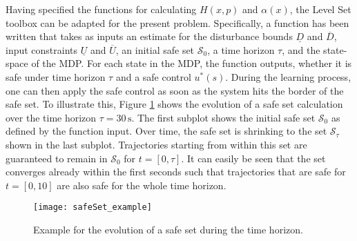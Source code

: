 \documentclass[../main.tex]{subfiles}
\begin{document}
Having specified the functions for calculating $H(x,p)$ and $\alpha(x)$, the Level Set toolbox \cite{mitchell2004toolbox} can be adapted for the present problem. Specifically, a function has been written that takes as inputs an estimate for the disturbance bounds $\underline{D}$ and $\overline{D}$, input constraints $\underline{U}$ and $\overline{U}$, an initial safe set $\mathcal{S}_0$, a time horizon $\tau$, and the state-space of the MDP. For each state in the MDP, the function outputs, whether it is safe under time horizon $\tau$ and a safe control $u^*(s)$. During the learning process, one can then apply the safe control as soon as the system hits the border of the safe set. To illustrate this, Figure \ref{fig:safeSet_example} shows the evolution of a safe set calculation over the time horizon $\tau = 30\,\text{s}$. The first subplot shows the initial safe set $\mathcal{S}_0$ as defined by the function input. Over time, the safe set is shrinking to the set $\mathcal{S}_\tau$ shown in the last subplot. Trajectories starting from within this set are guaranteed to remain in $\mathcal{S}_0$ for $t = [0, \tau]$. It can easily be seen that the set converges already within the first seconds such that trajectories that are safe for $t = [0, 10]$ are also safe for the whole time horizon. 

\begin{figure}[H]
    \centering
    \texttt{[image: safeSet\_example]}
        \caption{Example for the evolution of a safe set during the time horizon.}    
    \label{fig:safeSet_example}
\end{figure}
\end{document}
